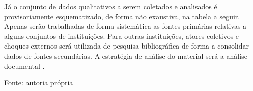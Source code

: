 Já o conjunto de dados qualitativos a serem coletados e analisados é
provisoriamente esquematizado, de forma não exaustiva, na tabela a
seguir. Apenas serão trabalhadas de forma sistemática as fontes
primárias relativas a alguns conjuntos de instituições. Para outras
instituições, atores coletivos e choques externos será utilizada de
pesquisa bibliográfica de forma a consolidar dados de fontes
secundárias. A estratégia de análise do material será a análise
documental .

\begin{table}[htbp]
\centering
\caption{Fontes de dados qualitativos}
\label{tab:cap03-fontes-qualitativas}
\end{table}

Fonte: autoria própria
